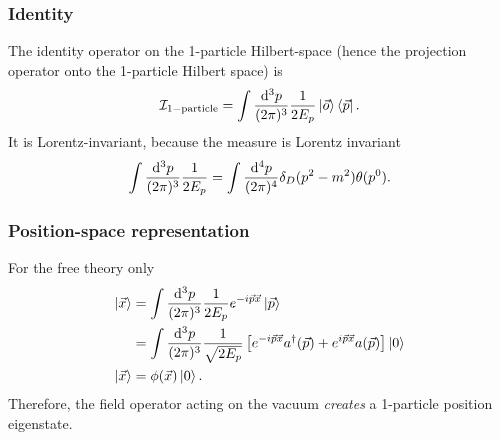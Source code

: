 \subsubsection{Identity} The identity operator on the 1-particle Hilbert-space (hence the projection operator onto the 1-particle Hilbert space) is 
\begin{equation}
	\mathcal{I}_{1-\mathrm{particle}} = \int \frac{\mathrm{d}^3 p}{(2 \pi)^3} \frac{1}{2 E_p} \ket{\vec{o}} \bra{\vec{p}}.
\end{equation}
It is Lorentz-invariant, because the measure is Lorentz invariant 
\begin{equation}
	\int \frac{\mathrm{d}^3 p}{(2 \pi)^3} \frac{1}{2 E_p} = \int \frac{\mathrm{d}^4 p}{(2 \pi)^4} \delta_D(p^2-m^2) \theta(p^0).
\end{equation}

\subsubsection{Position-space representation}
For the free theory only
\begin{align}
	\ket{\vec{x}}&=\int \frac{\mathrm{d}^3 p}{(2 \pi)^3} \frac{1}{2E_p} e^{-i \vec{p}\vec{x}} \ket{\vec{p}}\\
	&=\int \frac{\mathrm{d}^3 p}{(2 \pi)^3} \frac{1}{\sqrt{2E_p}} \left[e^{-i \vec{p}\vec{x}} a^{\dagger}(\vec{p}) + e^{i \vec{p}\vec{x}} a(\vec{p})\right] \ket{0}\\
	\ket{\vec{x}} &= \phi(\vec{x}) \ket{0}.
\end{align}
Therefore, the field operator acting on the vacuum \emph{creates}  a 1-particle position eigenstate.


